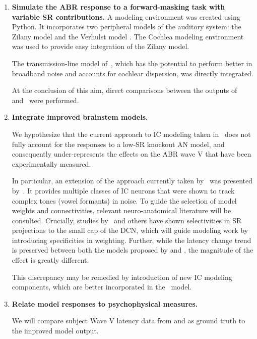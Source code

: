 \begin{enumerate}
	\item \textbf{Simulate the ABR response to a forward-masking task with variable SR contributions.}
	A modeling environment was created using Python.  It incorporates two peripheral models of the auditory system: the Zilany model \citep{Zilany2014Updated} and the Verhulst model \citep{Verhulst2015Functional}.  The Cochlea modeling environment \citep{Rudnicki2014Cochlea} was used to provide easy integration of the Zilany model.

	The transmission-line model of~\cite{Verhulst2015Functional}, which has the potential to perform better in broadband noise and accounts for cochlear dispersion, was directly integrated.

	At the conclusion of this aim, direct comparisons between the outputs of~\cite{Zilany2014Updated} and~\cite{Verhulst2015Functional} were performed.

	\item \textbf{Integrate improved brainstem models.}  

	We hypothesize that the current approach to IC modeling taken in~\cite{Verhulst2015Functional} does not fully account for the responses to a low-SR knockout AN model, and consequently under-represents the effects on the ABR wave V that have been experimentally measured.  

	In particular, an extension of the approach currently taken by~\cite{Verhulst2015Functional} was presented by~\cite{Carney2015Speech}.  It provides multiple classes of IC neurons that were shown to track complex tones (vowel formants) in noise.  To guide the selection of model weights and connectivities, relevant neuro-anatomical literature will be consulted.  Crucially, studies by~\cite{Ryugo2008Projections} and others have shown selectivities in SR projections to the small cap of the DCN, which will guide modeling work by introducing specificities in weighting. Further, while the latency change trend is preserved between both the models proposed by \citeauthor{Zilany2014Updated} and \citeauthor{Verhulst2015Functional}, the magnitude of the effect is greatly different.  

	This discrepancy may be remedied by introduction of new IC modeling components, which are better incorporated in the~\cite{Zilany2014Updated} model.
	
	\item \textbf{Relate model responses to psychophysical measures.}  

	We will compare subject Wave V latency data from \citeauthor{Mehraei2015Individual} and \citeauthor{Mehraei2016Auditory} as ground truth to the improved model output.
	
	
\end{enumerate}